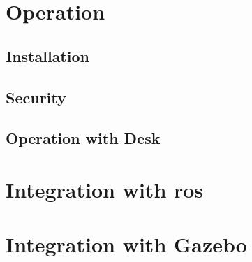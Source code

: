 


\section{Operation}
\label{sec:robotic_system_operation}

\subsection{Installation}
\label{subsec:robotic_system_operation_installation}


\subsection{Security}
\label{subsec:robotic_system_operation_security}


\subsection{Operation with Desk}
\label{subsec:robotic_system_operation_desk}




\section{Integration with \gls{ros}}
\label{sec:robotic_system_integration_ros}



\section{Integration with Gazebo}
\label{sec:robotic_system_integration_gazebo}

